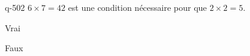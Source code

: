 \begin{truefalse}{q-502}
$6\times 7 = 42 $ est une condition nécessaire pour que $2\times 2=5$.
\item* Vrai
\item Faux
\end{truefalse}

